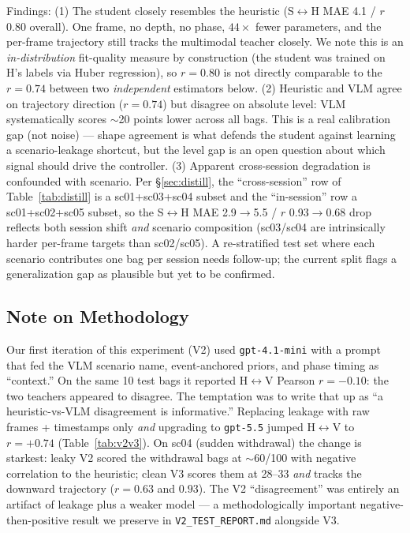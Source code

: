 \documentclass{article}
\newcommand{\code}[1]{\texttt{\small #1}}
\begin{document}
Findings: (1) The student closely resembles the heuristic (S$\leftrightarrow$H MAE 4.1 / $r$ 0.80 overall). One frame, no depth, no phase, $44\times$ fewer parameters, and the per-frame trajectory still tracks the multimodal teacher closely. We note this is an \emph{in-distribution} fit-quality measure by construction (the student was trained on H's labels via Huber regression), so $r=0.80$ is not directly comparable to the $r=0.74$ between two \emph{independent} estimators below. (2) Heuristic and VLM agree on trajectory direction ($r = 0.74$) but disagree on absolute level: VLM systematically scores $\sim$20 points lower across all bags. This is a real calibration gap (not noise) --- shape agreement is what defends the student against learning a scenario-leakage shortcut, but the level gap is an open question about which signal should drive the controller. (3) Apparent cross-session degradation is confounded with scenario. Per \S\ref{sec:distill}, the ``cross-session'' row of Table~\ref{tab:distill} is a sc01+sc03+sc04 subset and the ``in-session'' row a sc01+sc02+sc05 subset, so the S$\leftrightarrow$H MAE 2.9$\to$5.5 / $r$ 0.93$\to$0.68 drop reflects both session shift \emph{and} scenario composition (sc03/sc04 are intrinsically harder per-frame targets than sc02/sc05). A re-stratified test set where each scenario contributes one bag per session needs follow-up; the current split flags a generalization gap as plausible but yet to be confirmed.

\subsection{Note on Methodology}

Our first iteration of this experiment (V2) used \code{gpt-4.1-mini} with a prompt that fed the VLM scenario name, event-anchored priors, and phase timing as ``context.'' On the same 10 test bags it reported H$\leftrightarrow$V Pearson $r = -0.10$: the two teachers appeared to disagree. The temptation was to write that up as ``a heuristic-vs-VLM disagreement is informative.'' Replacing leakage with raw frames + timestamps only \emph{and} upgrading to \code{gpt-5.5} jumped H$\leftrightarrow$V to $r = +0.74$ (Table~\ref{tab:v2v3}). On sc04 (sudden withdrawal) the change is starkest: leaky V2 scored the withdrawal bags at $\sim$60/100 with negative correlation to the heuristic; clean V3 scores them at 28--33 \emph{and} tracks the downward trajectory ($r = 0.63$ and $0.93$). The V2 ``disagreement'' was entirely an artifact of leakage plus a weaker model --- a methodologically important negative-then-positive result we preserve in \code{V2\_TEST\_REPORT.md} alongside V3.
\end{document}
